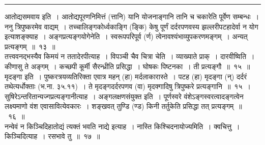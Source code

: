 \documentclass[11pt, openany]{book}
\begin{document}
\hrule
 
\vspace{2mm}
{\qtt आतोद्यसमवाय} इति~। आतोद्यपूरणनिमित्तं (त्तानि) यानि योजनाङ्गानि तानि च चकारेति पूर्वेण सम्बन्धः~। ननु त्रिपुष्करमेव वाद्यम्~। तच्चालिङ्गकोर्ध्वकाङ्गि (ङ्कि) केषु पूर्णं दर्दरपणवस्य झल्लरीपटहादेर्वा न योग इत्याशङ्क्याह~। {\qtt अङ्गप्रत्यङ्गयोगेनेति}~। स्वरूपपरिपूर्व (र्ण) त्वेनावश्यंभाव्युपकरणमङ्गम्~। अन्यत् प्रत्यङ्गम्~॥~१३~॥\\

तत्त्ववनद्भस्यैव किमयं न ततादेरपीत्याह~। {\qtt विपञ्ची चैव चित्रा} चेति~। व्याख्याते प्राक्~। {\qtt दारवीष्विति}~। कीणासु ते {\qtt अङ्गम्}~। कच्छपी कूर्मी सैरन्ध्रीति प्रसिद्धा~। घोषकः पिष्टनका~। ती प्रत्यङ्गौ~॥~१५~॥\\

{\qtt मृदङ्गा} इति~। पुष्करत्रयव्यतिरिक्ता एवात्र महन् (हा) मर्दलाकारास्ते~। पटह (हा) मृदङ्गा (न्) दर्दरं तथेत्यर्धोक्ताः (भ.ना. ३५.११)~। ते मृदङ्गदर्दरपणव (वा) मृदक्गादिषु त्रिपुष्करे प्रत्यङ्गानि~॥~१५~।\\

सुषिरेऽन्तरितान्यज्गप्रत्यङ्गानीत्याह~। अङ्गलक्षणसंयुक्त इति~। पूर्णस्वरे वंशेऽङ्गस्वरत्वादङ्गत्वेन लक्ष्यमाणो वंश एवासावित्येवकारः~। शङ्खवत् तुण्डि (ण्ड) किनी तर्तुकेति प्रसिद्धा तत् प्रत्यङ्गम्~॥~१६~॥\\

नन्वेवं न किञ्चिदिहातोद्यं त्यक्तं भवति नाद्ये इत्याह~। {\qtt नास्ति  किश्चिदनायोज्यमिति}~। क्वचित्तु~। किञ्चिदित्याह~। रसभावे तु~॥~१७~॥

\newpage
\end{document}
